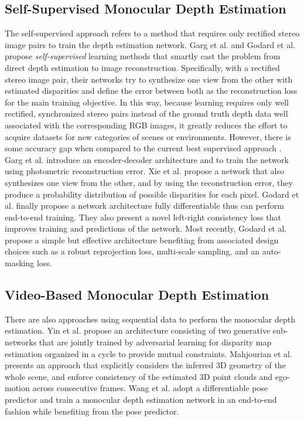 \documentclass[10pt,twocolumn,letterpaper]{article}
\begin{document}
\subsection{Self-Supervised Monocular Depth Estimation}
The self-supervised approach refers to a method that requires only rectified stereo image pairs to train the depth estimation network.
Garg et al. \cite{garg2016unsupervised} and Godard et al. \cite{godard2017unsupervised} propose \textit{self-supervised} learning methods that smartly cast the problem from direct depth estimation to image reconstruction.
Specifically, with a rectified stereo image pair, their networks try to synthesize one view from the other with estimated disparities and define the error between both as the reconstruction loss for the main training objective.
In this way, because learning requires only well rectified, synchronized stereo pairs instead of the ground truth depth data well associated with the corresponding RGB images, it greatly reduces the effort to acquire datasets for new categories of scenes or environments.
However, there is some accuracy gap when compared to the current best supervised approach \cite{yin2019enforcing}.
Garg et al. \cite{garg2016unsupervised} introduce an encoder-decoder architecture and to train the network using photometric reconstruction error. 
Xie et al. \cite{xie2016deep3d} propose a network that also synthesizes one view from the other, and by using the reconstruction error, they produce a probability distribution of possible disparities for each pixel.
Godard et al. \cite{godard2017unsupervised} finally propose a network architecture fully differentiable thus can perform end-to-end training.
They also present a novel left-right consistency loss that improves training and predictions of the network.
Most recently, Godard et al. \cite{godard2019digging} propose a simple but effective architecture benefiting from associated design choices such as a robust reprojection loss, multi-scale sampling, and an auto-masking loss.

\subsection{Video-Based Monocular Depth Estimation}
There are also approaches using sequential data to perform the monocular depth estimation.
Yin et al. \cite{yin2018geonet} propose an architecture consisting of two generative sub-networks that are jointly trained by adversarial learning for disparity map estimation organized in a cycle to provide mutual constraints.
Mahjourian et al. \cite{mahjourian2018unsupervised} presents an approach that explicitly considers the inferred 3D geometry of the whole scene, and enforce consistency of the estimated 3D point clouds and ego-motion across consecutive frames.
Wang et al. \cite{wang2018learning} adopt a differentiable pose predictor and train a monocular depth estimation network in an end-to-end fashion while benefiting from the pose predictor.
\end{document}
